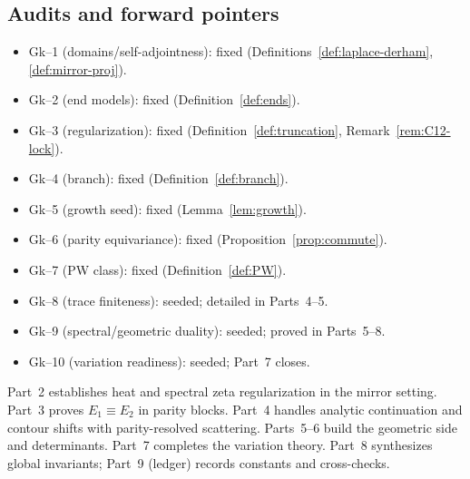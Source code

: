 \subsection{Audits and forward pointers}
\label{subsec:ch6-part1-audit} \relax

\begin{itemize}[leftmargin=*, itemsep=2pt]
  \item Gk–1 (domains/self-adjointness): fixed (Definitions~\ref{def:laplace-derham}, \ref{def:mirror-proj}). %
  \item Gk–2 (end models): fixed (Definition~\ref{def:ends}). %
  \item Gk–3 (regularization): fixed (Definition~\ref{def:truncation}, Remark~\ref{rem:C12-lock}). %
  \item Gk–4 (branch): fixed (Definition~\ref{def:branch}). %
  \item Gk–5 (growth seed): fixed (Lemma~\ref{lem:growth}). %
  \item Gk–6 (parity equivariance): fixed (Proposition~\ref{prop:commute}). %
  \item Gk–7 (PW class): fixed (Definition~\ref{def:PW}). %
  \item Gk–8 (trace finiteness): seeded; detailed in Parts~4–5. %
  \item Gk–9 (spectral/geometric duality): seeded; proved in Parts~5–8. %
  \item Gk–10 (variation readiness): seeded; Part~7 closes. %
\end{itemize}

 Part~2 establishes heat and spectral zeta regularization in the mirror setting. Part~3 proves $E_1\equiv E_2$ in parity blocks. Part~4 handles analytic continuation and contour shifts with parity-resolved scattering. Parts~5–6 build the geometric side and determinants. Part~7 completes the variation theory. Part~8 synthesizes global invariants; Part~9 (ledger) records constants and cross-checks. %


